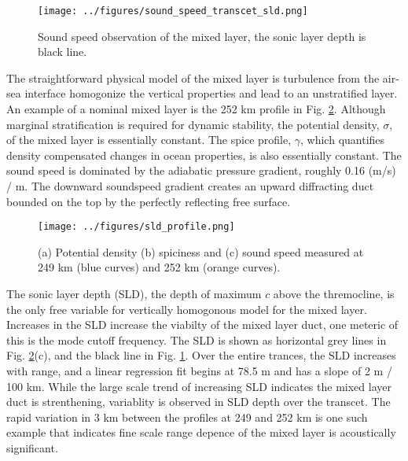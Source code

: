 \documentclass[preprint,NumberedRefs]{JASA}
\begin{document}
\begin{figure}
\texttt{[image: ../figures/sound\_speed\_transcet\_sld.png]}
\caption{\label{fig:transcet}{Sound speed observation of the mixed layer, the sonic layer depth is black line.}}
\end{figure}

The straightforward physical model of the mixed layer is turbulence from the air-sea interface homogonize the vertical properties and lead to an unstratified layer. An example of a nominal mixed layer is the 252 km profile in Fig. \ref{fig:profiles}. Although marginal stratification is required for dynamic stability, the potential density, $\sigma$, of the mixed layer is essentially constant. The spice profile, $\gamma$, which quantifies density compensated changes in ocean properties, is also essentially constant. The sound speed is dominated by the adiabatic pressure gradient, roughly 0.16 (m/s) / m. The downward soundspeed gradient creates an upward diffracting duct bounded on the top by the perfectly reflecting free surface.

\begin{figure}
\texttt{[image: ../figures/sld\_profile.png]}
    \caption{\label{fig:profiles}{(a) Potential density (b) spiciness and (c) sound speed measured at 249 km (blue curves) and 252 km (orange curves).}}
\end{figure}

The sonic layer depth (SLD), the depth of maximum $c$ above the thremocline, is the only free variable for vertically homogonous model for the mixed layer. Increases in the SLD increase the viabilty of the mixed layer duct, one meteric of this is the mode cutoff frequency. The SLD is shown as horizontal grey lines in Fig. \ref{fig:profiles}(c), and the black line in Fig. \ref{fig:transcet}. Over the entire trances, the SLD increases with range, and a linear regression fit begins at 78.5 m and has a slope of 2 m / 100 km. While the large scale trend of increasing SLD indicates the mixed layer duct is strenthening, variablity is observed in SLD depth over the transcet. The rapid variation in 3 km between the profiles at 249 and 252 km is one such example that indicates fine scale range depence of the mixed layer is acoustically significant.
\end{document}
